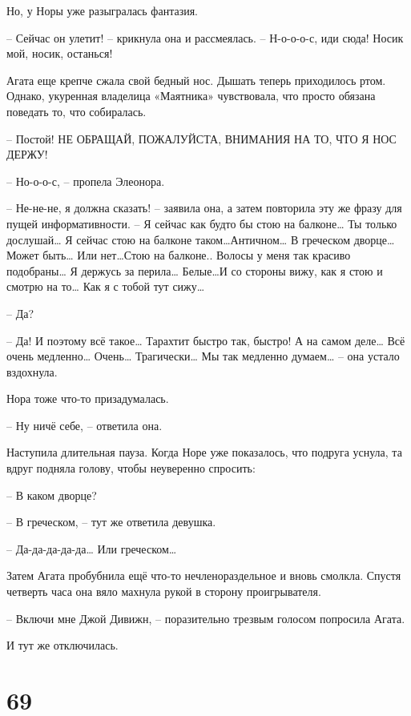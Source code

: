 \documentclass[
  a5paperpaper,
  DIV=11,
  numbers=noendperiod]{scrreprt}
\begin{document}
Но, у Норы уже разыгралась фантазия.

-- Сейчас он улетит! -- крикнула она и рассмеялась. -- Н-о-о-о-с, иди
сюда! Носик мой, носик, останься!

Агата еще крепче сжала свой бедный нос. Дышать теперь приходилось ртом.
Однако, укуренная владелица «Маятника» чувствовала, что просто обязана
поведать то, что собиралась.

-- Постой! НЕ ОБРАЩАЙ, ПОЖАЛУЙСТА, ВНИМАНИЯ НА ТО, ЧТО Я НОС ДЕРЖУ!

-- Но-о-о-с, -- пропела Элеонора.

-- Не-не-не, я должна сказать! -- заявила она, а затем повторила эту же
фразу для пущей информативности. -- Я сейчас как будто бы стою на
балконе\ldots{} Ты только дослушай\ldots{} Я сейчас стою на балконе
таком\ldots Античном\ldots{} В греческом дворце\ldots Может быть\ldots{}
Или нет\ldots Стою на балконе.. Волосы у меня так красиво
подобраны\ldots{} Я держусь за перила\ldots{} Белые\ldots И со стороны
вижу, как я стою и смотрю на то\ldots{} Как я с тобой тут сижу\ldots{}

-- Да?

-- Да! И поэтому всё такое\ldots{} Тарахтит быстро так, быстро! А на
самом деле\ldots{} Всё очень медленно\ldots{} Очень\ldots{}
Трагически\ldots{} Мы так медленно думаем\ldots{} -- она устало
вздохнула.

Нора тоже что-то призадумалась.

-- Ну ничё себе, -- ответила она.

Наступила длительная пауза. Когда Норе уже показалось, что подруга
уснула, та вдруг подняла голову, чтобы неуверенно спросить:

-- В каком дворце?

-- В греческом, -- тут же ответила девушка.

-- Да-да-да-да-да\ldots{} Или греческом\ldots{}

Затем Агата пробубнила ещё что-то нечленораздельное и вновь смолкла.
Спустя четверть часа она вяло махнула рукой в сторону проигрывателя.

-- Включи мне Джой Дивижн, -- поразительно трезвым голосом попросила
Агата.

И тут же отключилась.

\section*{69}\label{69}
\end{document}
